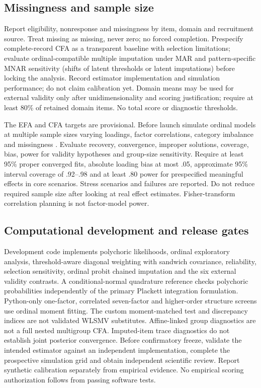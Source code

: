\subsection{Missingness and sample size}
Report eligibility, nonresponse and missingness by item, domain and recruitment source. Treat missing as missing, never zero; no forced completion. Prespecify complete-record CFA as a transparent baseline with selection limitations; evaluate ordinal-compatible multiple imputation under MAR and pattern-specific MNAR sensitivity (shifts of latent thresholds or latent imputations) before locking the analysis. Record estimator implementation and simulation performance; do not claim calibration yet. Domain means may be used for external validity only after unidimensionality and scoring justification; require at least 80\% of retained domain items. No total score or diagnostic thresholds.

The EFA and CFA targets are provisional. Before launch simulate ordinal models at multiple sample sizes varying loadings, factor correlations, category imbalance and missingness \parencite{muthen2002}. Evaluate recovery, convergence, improper solutions, coverage, bias, power for validity hypotheses and group-size sensitivity. Require at least 95\% proper converged fits, absolute loading bias at most .05, approximate 95\% interval coverage of .92--.98 and at least .80 power for prespecified meaningful effects in core scenarios. Stress scenarios and failures are reported. Do not reduce required sample size after looking at real effect estimates. Fisher-transform correlation planning is not factor-model power.


\subsection{Computational development and release gates}
Development code implements polychoric likelihoods, ordinal exploratory analysis, threshold-aware diagonal weighting with sandwich covariance, reliability, selection sensitivity, ordinal probit chained imputation and the six external validity contrasts. A conditional-normal quadrature reference checks polychoric probabilities independently of the primary Plackett integration formulation. Python-only one-factor, correlated seven-factor and higher-order structure screens use ordinal moment fitting. The custom moment-matched test and discrepancy indices are not validated WLSMV substitutes. Affine-linked group diagnostics are not a full nested multigroup CFA. Imputed-item trace diagnostics do not establish joint posterior convergence. Before confirmatory freeze, validate the intended estimator against an independent implementation, complete the prospective simulation grid and obtain independent scientific review. Report synthetic calibration separately from empirical evidence. No empirical scoring authorization follows from passing software tests.
